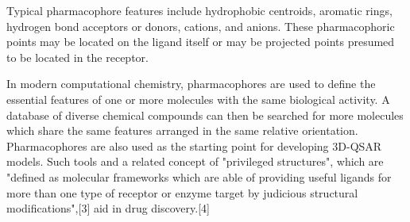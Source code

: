 Typical pharmacophore features include hydrophobic centroids, aromatic rings, hydrogen bond acceptors or donors, cations, and anions. These pharmacophoric points may be located on the ligand itself or may be projected points presumed to be located in the receptor.

In modern computational chemistry, pharmacophores are used to define the essential features of one or more molecules with the same biological activity. A database of diverse chemical compounds can then be searched for more molecules which share the same features arranged in the same relative orientation. Pharmacophores are also used as the starting point for developing 3D-QSAR models. Such tools and a related concept of "privileged structures", which are "defined as molecular frameworks which are able of providing useful ligands for more than one type of receptor or enzyme target by judicious structural modifications",[3] aid in drug discovery.[4]

